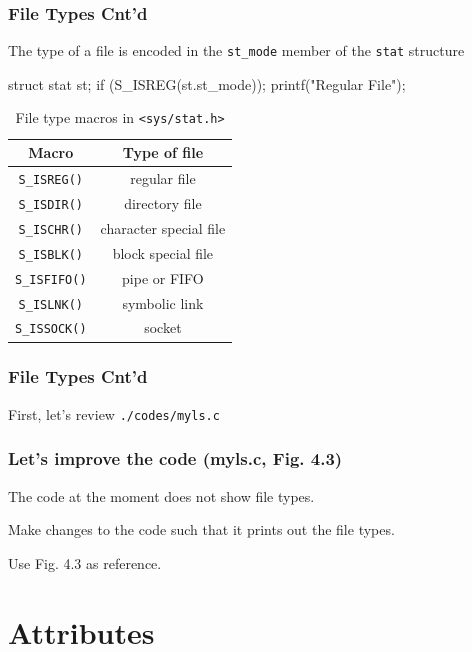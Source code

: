\documentclass[newPxFont,sthlmFooter,nooffset]{beamer}
\begin{document}
\begin{frame}[containsverbatim,t]
  \frametitle{File Types Cnt'd}
The type of a file is encoded in the \texttt{st\_mode} member of the \texttt{stat} structure

\begin{codedef}
struct stat st;
if (S_ISREG(st.st_mode));
    printf("Regular File\n");
\end{codedef}


\begin{center}
  \begin{table}
    \centering
    \begin{tabular}[t]{c | c}
    Macro & Type of file \\ \hline
    \texttt{S\_ISREG()}	&	regular file	\\  \hline
    \texttt{S\_ISDIR()}	&	directory file	\\  \hline
    \texttt{S\_ISCHR()}	&	character special file	\\  \hline
    \texttt{S\_ISBLK()}	&	block special file	\\  \hline
    \texttt{S\_ISFIFO()}	&	pipe or FIFO	\\  \hline
    \texttt{S\_ISLNK()}	&	symbolic link	\\  \hline
    \texttt{S\_ISSOCK()}	&	socket 	\\
  \end{tabular}
  \caption{File type macros in \texttt{<sys/stat.h>}}
\end{table}

\end{center}

\end{frame}

\begin{frame}[containsverbatim,t]
  \frametitle{File Types Cnt'd}
First, let's review \texttt{./codes/myls.c}
  
\end{frame}

\begin{frame}[t]
  \frametitle{Let's improve the code (myls.c, Fig. 4.3)}
The code at the moment does not show file types.

Make changes to the code such that it prints out the file types.

Use Fig. 4.3 as reference.

\end{frame}

\section{Attributes}
\end{document}
